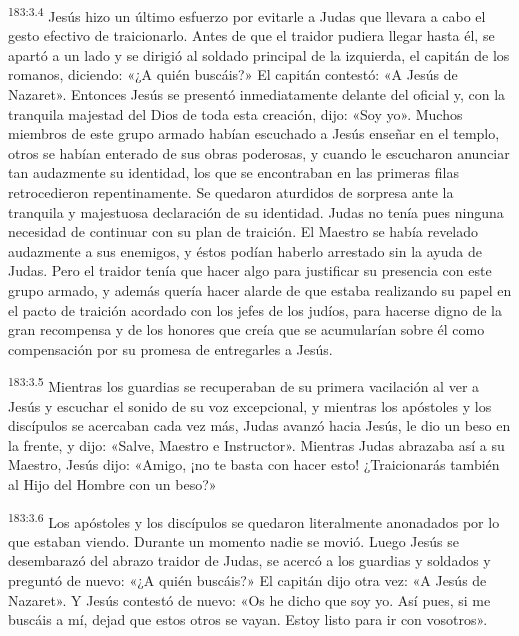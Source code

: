 \par 
\textsuperscript{183:3.4} Jesús hizo un último esfuerzo por evitarle a Judas que llevara a cabo el gesto efectivo de traicionarlo. Antes de que el traidor pudiera llegar hasta él, se apartó a un lado y se dirigió al soldado principal de la izquierda, el capitán de los romanos, diciendo: «¿A quién buscáis?» El capitán contestó: «A Jesús de Nazaret». Entonces Jesús se presentó inmediatamente delante del oficial y, con la tranquila majestad del Dios de toda esta creación, dijo: «Soy yo». Muchos miembros de este grupo armado habían escuchado a Jesús enseñar en el templo, otros se habían enterado de sus obras poderosas, y cuando le escucharon anunciar tan audazmente su identidad, los que se encontraban en las primeras filas retrocedieron repentinamente. Se quedaron aturdidos de sorpresa ante la tranquila y majestuosa declaración de su identidad. Judas no tenía pues ninguna necesidad de continuar con su plan de traición. El Maestro se había revelado audazmente a sus enemigos, y éstos podían haberlo arrestado sin la ayuda de Judas. Pero el traidor tenía que hacer algo para justificar su presencia con este grupo armado, y además quería hacer alarde de que estaba realizando su papel en el pacto de traición acordado con los jefes de los judíos, para hacerse digno de la gran recompensa y de los honores que creía que se acumularían sobre él como compensación por su promesa de entregarles a Jesús.

\par 
\textsuperscript{183:3.5} Mientras los guardias se recuperaban de su primera vacilación al ver a Jesús y escuchar el sonido de su voz excepcional, y mientras los apóstoles y los discípulos se acercaban cada vez más, Judas avanzó hacia Jesús, le dio un beso en la frente, y dijo: «Salve, Maestro e Instructor». Mientras Judas abrazaba así a su Maestro, Jesús dijo: «Amigo, ¡no te basta con hacer esto! ¿Traicionarás también al Hijo del Hombre con un beso?»

\par 
\textsuperscript{183:3.6} Los apóstoles y los discípulos se quedaron literalmente anonadados por lo que estaban viendo. Durante un momento nadie se movió. Luego Jesús se desembarazó del abrazo traidor de Judas, se acercó a los guardias y soldados y preguntó de nuevo: «¿A quién buscáis?» El capitán dijo otra vez: «A Jesús de Nazaret». Y Jesús contestó de nuevo: «Os he dicho que soy yo. Así pues, si me buscáis a mí, dejad que estos otros se vayan. Estoy listo para ir con vosotros».

